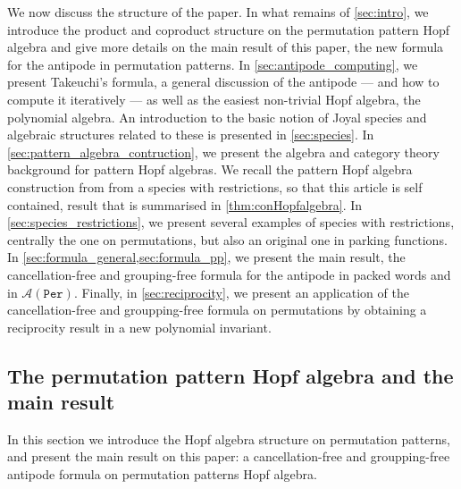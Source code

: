 \documentclass[12pt, reqno]{amsart}
\theoremstyle{definition}
\begin{document}
We now discuss the structure of the paper.
In what remains of \cref{sec:intro}, we introduce the product and coproduct structure on the permutation pattern Hopf algebra and give more details on the main result of this paper, the new formula for the antipode in permutation patterns.
In \cref{sec:antipode_computing}, we present Takeuchi's formula, a general discussion of the antipode --- and how to compute it iteratively --- as well as the easiest non-trivial Hopf algebra, the polynomial algebra.
An introduction to the basic notion of Joyal species and algebraic structures related to these is presented in \cref{sec:species}. In \cref{sec:pattern_algebra_contruction}, we present the algebra and category theory background for pattern Hopf algebras. We recall the pattern Hopf algebra construction from \cite{Penaguiao2020} from a species with restrictions, so that this article is self contained, result that is summarised in \cref{thm:conHopfalgebra}.
In \cref{sec:species_restrictions}, we present several examples of species with restrictions, centrally the one on permutations, but also an original one in parking functions.
In \cref{sec:formula_general,sec:formula_pp}, we present the main result, the cancellation-free and grouping-free formula for the antipode in packed words and in $\mathcal{A}(\mathtt{Per})$.
Finally, in \cref{sec:reciprocity}, we present an application of the cancellation-free and groupping-free formula on permutations by obtaining a reciprocity result in a new polynomial invariant.



\subsection{The permutation pattern Hopf algebra and the main result}

In this section we introduce the Hopf algebra structure on permutation patterns, and present the main result on this paper: a cancellation-free and groupping-free antipode formula on permutation patterns Hopf algebra.

\
\end{document}
